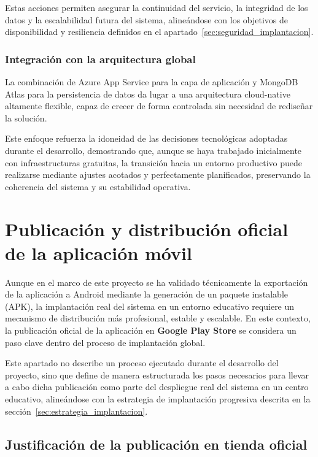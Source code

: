 Estas acciones permiten asegurar la continuidad del servicio, la integridad de los datos y la escalabilidad futura del sistema, alineándose con los objetivos de disponibilidad y resiliencia definidos en el apartado~\ref{sec:seguridad_implantacion}.

\subsubsection{Integración con la arquitectura global}

La combinación de Azure App Service para la capa de aplicación y MongoDB Atlas para la persistencia de datos da lugar a una arquitectura cloud-native altamente flexible, capaz de crecer de forma controlada sin necesidad de rediseñar la solución.

Este enfoque refuerza la idoneidad de las decisiones tecnológicas adoptadas durante el desarrollo, demostrando que, aunque se haya trabajado inicialmente con infraestructuras gratuitas, la transición hacia un entorno productivo puede realizarse mediante ajustes acotados y perfectamente planificados, preservando la coherencia del sistema y su estabilidad operativa.
\section{Publicación y distribución oficial de la aplicación móvil}
\label{sec:playstore_implantacion}

Aunque en el marco de este proyecto se ha validado técnicamente la exportación de la aplicación a Android mediante la generación de un paquete instalable (APK), la implantación real del sistema en un entorno educativo requiere un mecanismo de distribución más profesional, estable y escalable. En este contexto, la publicación oficial de la aplicación en \textbf{Google Play Store} se considera un paso clave dentro del proceso de implantación global.

Este apartado no describe un proceso ejecutado durante el desarrollo del proyecto, sino que define de manera estructurada los pasos necesarios para llevar a cabo dicha publicación como parte del despliegue real del sistema en un centro educativo, alineándose con la estrategia de implantación progresiva descrita en la sección~\ref{sec:estrategia_implantacion}.

\subsection{Justificación de la publicación en tienda oficial}

